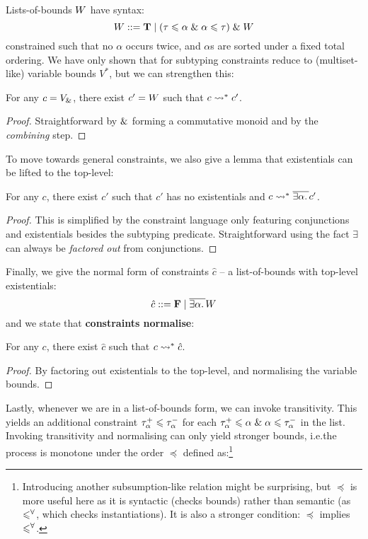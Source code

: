 Lists-of-bounds $W$ have syntax:
$$ W ::= \mathbf T \mid (\tau \leqslant \alpha \;\&\; \alpha \leqslant \tau) \;\&\; W $$
constrained such that no $\alpha$ occurs twice, and $\alpha$s are sorted under a fixed total ordering. We have only shown that for subtyping constraints reduce to (multiset-like) variable bounds $V^*$, but we can strengthen this:
\begin{lemma}
For any $c = V_{\&}$, there exist $c' = W$ such that $c \leadsto^* c'$.
\end{lemma}
\begin{proof}
    Straightforward by $\&$ forming a commutative monoid and by the \emph{combining} step.
\end{proof}
To move towards general constraints, we also give a lemma that existentials can be lifted to the top-level:
\begin{lemma}
    For any $c$, there exist $c'$ such that $c'$ has no existentials and $c \leadsto^* \overline{\exists{\alpha \ldotp {}}} c'$.
\end{lemma}
\begin{proof}
    This is simplified by the constraint language only featuring conjunctions and existentials besides the subtyping predicate. Straightforward using the fact $\exists$ can always be \emph{factored out} from conjunctions.
\end{proof}
Finally, we give the normal form of constraints $\hat c$ -- a list-of-bounds with top-level existentials:
$$ \hat c ::= \mathbf F \mid \overline{\exists \alpha \ldotp {}} W $$
and we state that \textbf{constraints normalise}:
\begin{theorem}
For any $c$, there exist $\hat c$ such that $c \leadsto^* \hat c$.
\end{theorem}
\begin{proof}
    By factoring out existentials to the top-level, and normalising the variable bounds.
\end{proof}
Lastly, whenever we are in a list-of-bounds form, we can invoke transitivity. This yields an additional constraint $\tau^+_\alpha \leqslant \tau^-_\alpha$ for each $\tau^+_\alpha \leqslant \alpha \;\&\; \alpha \leqslant \tau^-_\alpha$ in the list. Invoking transitivity and normalising can only yield stronger bounds, i.e.\@ the process is monotone under the order $\preceq$ defined as:\footnote{Introducing another subsumption-like relation might be surprising, but $\preceq$ is more useful here as it is syntactic (checks bounds) rather than semantic (as $\leqslant^\forall$, which checks instantiations). It is also a stronger condition: $\preceq$ implies $\leqslant^\forall$.}
